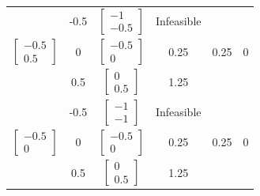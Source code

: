 \documentclass[14pt, a4paper]{extarticle}
\begin{document}
\begin{latin}
\begin{longtable}{|c|c|c|c|c|c|}
			&          -0.5              &$\begin{bmatrix} -1 \\ -0.5 \end{bmatrix}$      & Infeasible                        &       &          \\  \cline{2-4} 
			\multirow{-3}{*}{$\begin{bmatrix} -0.5 \\ 0.5 \end{bmatrix}$}&     0                   &$\begin{bmatrix} -0.5 \\ 0 \end{bmatrix}$      &     0.25                   &  0.25           &   0    \\  \cline{2-4} 
			&         0.5               &$\begin{bmatrix} 0 \\ 0.5 \end{bmatrix}$      &        1.25                    &          &      \\  \cline{2-4} \hline
			
			&              -0.5          &$\begin{bmatrix} -1 \\ -1 \end{bmatrix}$      & Infeasible                        &      &     \\  \cline{2-4} 
			\multirow{-3}{*}{$\begin{bmatrix} -0.5 \\ 0 \end{bmatrix}$}&      0                  &$\begin{bmatrix} -0.5 \\ 0 \end{bmatrix}$      &      0.25                  &  0.25          &     0   \\  \cline{2-4} 
			&              0.5          &$\begin{bmatrix} 0 \\ 0.5 \end{bmatrix}$      &    1.25                &                 &     \\  \cline{2-4} \hline	
			

\end{longtable}
\end{latin}
\end{document}
